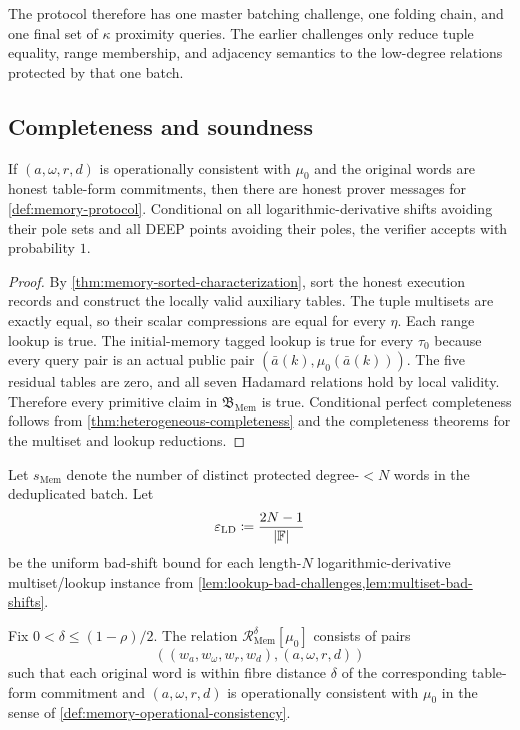 The protocol therefore has one master batching challenge, one folding chain, and one final set of $\kappa$ proximity queries.  The earlier challenges only reduce tuple equality, range membership, and adjacency semantics to the low-degree relations protected by that one batch.

\subsection{Completeness and soundness}
\label{sec:memory-soundness}

\begin{theorem}
\label{thm:memory-completeness}
If $(a,\omega,r,d)$ is operationally consistent with $\mu_0$ and the original words are honest table-form commitments, then there are honest prover messages for \cref{def:memory-protocol}.  Conditional on all logarithmic-derivative shifts avoiding their pole sets and all DEEP points avoiding their poles, the verifier accepts with probability $1$.
\end{theorem}

\begin{proof}
By \cref{thm:memory-sorted-characterization}, sort the honest execution records and construct the locally valid auxiliary tables.  The tuple multisets are exactly equal, so their scalar compressions are equal for every $\eta$.  Each range lookup is true.  The initial-memory tagged lookup is true for every $\tau_0$ because every query pair is an actual public pair $(\bar a(k),\mu_0(\bar a(k)))$.  The five residual tables are zero, and all seven Hadamard relations hold by local validity.  Therefore every primitive claim in $\mathfrak B_{\mathrm{Mem}}$ is true.  Conditional perfect completeness follows from \cref{thm:heterogeneous-completeness} and the completeness theorems for the multiset and lookup reductions.
\end{proof}

Let $s_{\mathrm{Mem}}$ denote the number of distinct protected degree-$<N$ words in the deduplicated batch.  Let
\begin{equation}
  \varepsilon_{\mathrm{LD}}
  \coloneqq
  \frac{2N-1}{|\mathbb{F}|}
  \label{eq:memory-one-lookup-bad-shift}
\end{equation}
be the uniform bad-shift bound for each length-$N$ logarithmic-derivative multiset/lookup instance from \cref{lem:lookup-bad-challenges,lem:multiset-bad-shifts}.

\begin{definition}
\label{def:memory-committed-relation}
Fix $0<\delta\le(1-\rho)/2$.  The relation $\mathcal R^{\delta}_{\mathrm{Mem}}[\mu_0]$ consists of pairs
\[
  ((w_a,w_\omega,w_r,w_d),(a,\omega,r,d))
\]
such that each original word is within fibre distance $\delta$ of the corresponding table-form commitment and $(a,\omega,r,d)$ is operationally consistent with $\mu_0$ in the sense of \cref{def:memory-operational-consistency}.
\end{definition}

